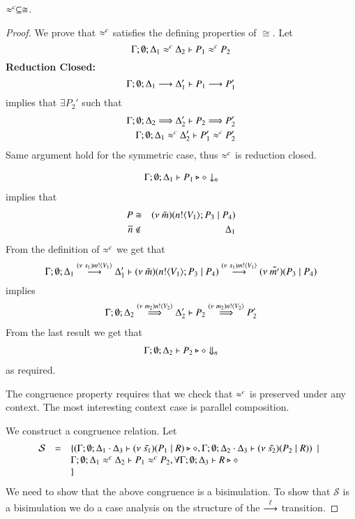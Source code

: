 \begin{lemma}
	\label{lem:wbc_is_cong}
	$\wbc \subseteq \cong$.
\end{lemma}


\begin{proof}
	\noi We prove that $\wbc$ satisfies the defining properties of $\cong$. Let
%
	\[
		\horel{\Gamma}{\Delta_1}{P_1}{\wbc}{\Delta_2}{P_2}
	\]
%
	{\bf Reduction Closed:}
%
	\[
		\horel{\Gamma}{\Delta_1}{P_1}{\by{}}{\Delta_1'}{P_1'}
	\]
%
	\noi implies that 
	$\exists P_2'$ such that 
%
	\begin{eqnarray*}
		\horel{\Gamma}{\Delta_2}{P_2}{\By{}}{\Delta_2'}{P_2'}\\
		\horel{\Gamma}{\Delta_1}{P_1'}{\wbc}{\Delta_2'}{P_2'}
	\end{eqnarray*}
%
	\noi Same argument hold for the symmetric case, thus $\wbc$ is reduction closed.

%
	\begin{eqnarray*}
		\Gamma; \emptyset; \Delta_1 \proves P_1 \hastype \Proc \barb{n}
	\end{eqnarray*}
%
	implies that
	\begin{eqnarray*}
		P &\cong& \newsp{\tilde{m}}{\bout{n}{V_1} P_3 \Par P_4}\\
		\dual{n} &\notin& \Delta_1
	\end{eqnarray*}
%
	\noi From the definition of $\wbc$ we get that
%
\[
	\horel	{\Gamma}{\Delta_1}{\newsp{\tilde{m}}{\bout{n}{V_1} P_3 \Par P_4}}
		{\by{\news{s_1} \bactout{m}{V_1}}}
		{\Delta_1'}
		{\newsp{\tilde{m'}}{P_3 \Par P_4}}
\]
%
	\noi implies
%
	\begin{eqnarray*}
		\horel{\Gamma}{\Delta_2}{P_2}{\By{\news{m_2} \bactout{n}{V_2}}}{\Delta_2'}{P_2'}\\
	\end{eqnarray*}
%
	\noi From the last result we get that
%
	\begin{eqnarray*}
		\Gamma; \emptyset; \Delta_2 \proves P_2 \hastype \Proc \Barb{n}
	\end{eqnarray*}
%
	\noi as required.


	\noi The congruence property requires that we check that $\wbc$
	is preserved under any context.
	The most interesting context case is parallel composition.

	\noi We construct a congruence relation. Let
	\[
	\begin{array}{rcl}
		\mathcal{S} &=&	\set{(\Gamma; \emptyset; \Delta_1 \cat \Delta_3 \proves \newsp{\tilde{s_1}}{P_1 \Par R} \hastype \Proc, \Gamma; \emptyset; \Delta_2 \cat \Delta_3 \proves \newsp{\tilde{s_2}}{P_2 \Par R}) \setbar \\
		& &	\horel{\Gamma}{\Delta_1}{P_1}{\wbc}{\Delta_2}{P_2}, \forall \Gamma; \emptyset; \Delta_3 \proves R \hastype \Proc\\
		& &}
	\end{array}
	\]
	\noi We need to show that the above congruence is a bisimulation.
	To show that $\mathcal{S}$ is a bisimulation we do a case analysis on the structure
	of the $\by{\ell}$ transition.


\end{proof}
